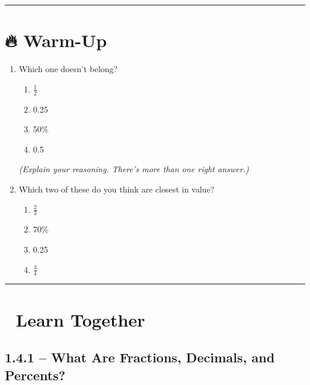 \documentclass[
  letterpaper,
  DIV=11,
  numbers=noendperiod]{scrreprt}
\providecommand{\tightlist}{%
  \setlength{\itemsep}{0pt}\setlength{\parskip}{0pt}}
\begin{document}
\begin{center}\rule{0.5\linewidth}{0.5pt}\end{center}

\section*{🔥 Warm-Up}\label{warm-up-3}


\begin{enumerate}
\def\labelenumi{\arabic{enumi}.}
\item
  Which one doesn't belong?

  \begin{enumerate}
  \def\labelenumii{\alph{enumii}.}
  \tightlist
  \item
    \(\frac{1}{2}\)
  \item
    0.25
  \item
    50\%
  \item
    0.5
  \end{enumerate}

  \emph{(Explain your reasoning. There's more than one right answer.)}
\item
  Which two of these do you think are closest in value?

  \begin{enumerate}
  \def\labelenumii{\alph{enumii}.}
  \tightlist
  \item
    \(\frac{2}{3}\)
  \item
    70\%
  \item
    0.25
  \item
    \(\frac{3}{4}\)
  \end{enumerate}
\end{enumerate}

\begin{center}\rule{0.5\linewidth}{0.5pt}\end{center}

\section*{👥 Learn Together}\label{learn-together-3}


\subsection*{1.4.1 -- What Are Fractions, Decimals, and
Percents?}\label{what-are-fractions-decimals-and-percents}
\end{document}
